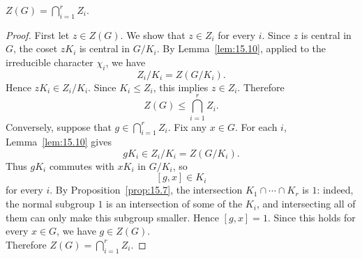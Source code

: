\documentclass[../Odyssey_Project.tex]{subfiles}
\begin{document}
\begin{proposition}
\label{prop:15.12}
$Z(G) = \bigcap_{i=1}^{r} Z_i$.
\end{proposition}
\begin{proof}
    First let $z\in Z(G)$. We show that $z\in Z_i$ for every $i$. Since $z$ is central in $G$, the coset $zK_i$ is central in $G/K_i$. By Lemma~\ref{lem:15.10}, applied to the irreducible character $\chi_i$, we have
    \[
        Z_i/K_i=Z(G/K_i).
    \]
    Hence $zK_i\in Z_i/K_i$. Since $K_i\leq Z_i$, this implies $z\in Z_i$. Therefore
    \[
        Z(G)\leq\bigcap_{i=1}^{r}Z_i.
    \]
    Conversely, suppose that $g\in\bigcap_{i=1}^{r}Z_i$. Fix any $x\in G$. For each $i$, Lemma~\ref{lem:15.10} gives
    \[
        gK_i\in Z_i/K_i=Z(G/K_i).
    \]
    Thus $gK_i$ commutes with $xK_i$ in $G/K_i$, so
    \[
        [g,x]\in K_i
    \]
    for every $i$. By Proposition~\ref{prop:15.7}, the intersection $K_1\cap\cdots\cap K_r$ is $1$: indeed, the normal subgroup $1$ is an intersection of some of the $K_i$, and intersecting all of them can only make this subgroup smaller. Hence $[g,x]=1$. Since this holds for every $x\in G$, we have $g\in Z(G)$.\\
    Therefore $Z(G)=\bigcap_{i=1}^{r}Z_i$.
\end{proof}
\end{document}
